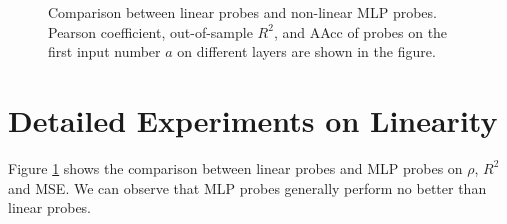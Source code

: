 \documentclass[11pt]{article}
\begin{document}


\begin{figure}[ht]
    \centering
    \caption{Comparison between linear probes and non-linear MLP probes. Pearson coefficient, out-of-sample $R^2$, and AAcc of probes on the first input number $a$ on different layers are shown in the figure.}
    \label{fig:appendix_linearity}
\end{figure}


\section{Detailed Experiments on Linearity}
\label{sec:appendix_linearity}
Figure \ref{fig:appendix_linearity} shows the comparison between linear probes and MLP probes on $\rho$, $R^2$ and MSE.
We can observe that MLP probes generally perform no better than linear probes.
\end{document}
